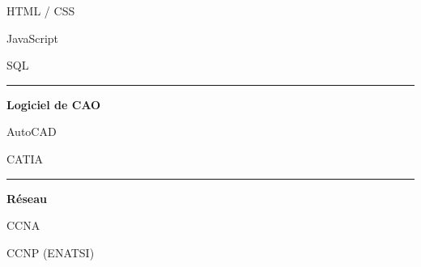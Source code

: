 \documentclass[a4paper]{letter}
\newcommand{\divider}{\rule{\linewidth}{0.9pt}}
\begin{document}
\begin{minipage}[t]{0.40\textwidth}
\faCircleNotch \quad HTML / CSS

\faCircleNotch \quad JavaScript

\faCircleNotch \quad SQL

\divider


{\large \textbf{Logiciel de CAO}}

\faCircleNotch \quad AutoCAD

\faCircleNotch \quad CATIA

\divider



{\large \textbf{Réseau}}

\faNetworkWired \quad CCNA

\faNetworkWired \quad CCNP (ENATSI)

\end{minipage}
\hfill
\end{document}
